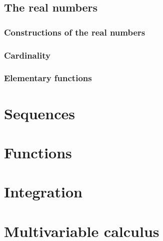 \documentclass{../crs}
\begin{document}
\section{The real numbers}
\subsection{Constructions of the real numbers}

\subsection{Cardinality}

\subsection{Elementary functions}





\chapter{Sequences}


\chapter{Functions}


\chapter{Integration}


\chapter{Multivariable calculus}
\end{document}
